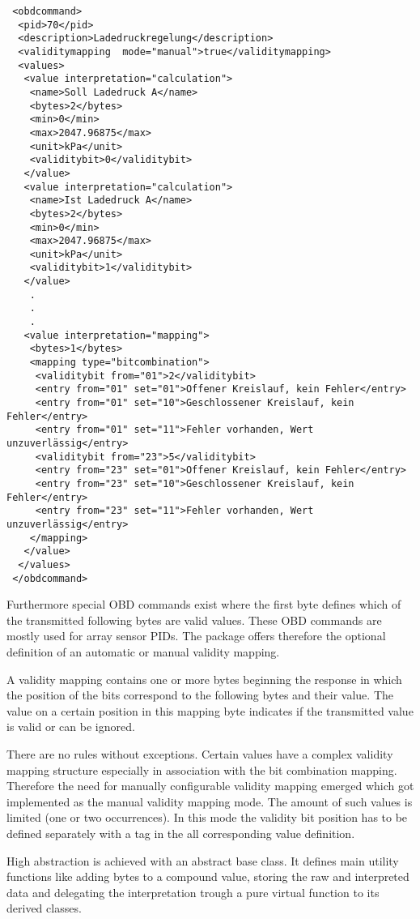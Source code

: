 \begin{lstlisting}
 <obdcommand>
  <pid>70</pid>
  <description>Ladedruckregelung</description>
  <validitymapping  mode="manual">true</validitymapping>
  <values>
   <value interpretation="calculation">
    <name>Soll Ladedruck A</name>
    <bytes>2</bytes>
    <min>0</min>
    <max>2047.96875</max>
    <unit>kPa</unit>
    <validitybit>0</validitybit>    
   </value>
   <value interpretation="calculation">
    <name>Ist Ladedruck A</name>
    <bytes>2</bytes>
    <min>0</min>
    <max>2047.96875</max>
    <unit>kPa</unit>    
    <validitybit>1</validitybit>            
   </value>
    .
    .
    .
   <value interpretation="mapping">
    <bytes>1</bytes>
    <mapping type="bitcombination">
     <validitybit from="01">2</validitybit>
     <entry from="01" set="01">Offener Kreislauf, kein Fehler</entry>
     <entry from="01" set="10">Geschlossener Kreislauf, kein Fehler</entry>
     <entry from="01" set="11">Fehler vorhanden, Wert unzuverlässig</entry>
     <validitybit from="23">5</validitybit>
     <entry from="23" set="01">Offener Kreislauf, kein Fehler</entry>
     <entry from="23" set="10">Geschlossener Kreislauf, kein Fehler</entry>
     <entry from="23" set="11">Fehler vorhanden, Wert unzuverlässig</entry>
    </mapping>        
   </value>
  </values>
 </obdcommand>
\end{lstlisting}

Furthermore special OBD commands exist where the first byte defines which of the transmitted following bytes are valid values. These OBD 
commands are mostly used for array sensor PIDs. The package offers therefore the optional definition of an automatic or manual validity mapping.

A validity mapping contains one or more bytes beginning the response in which the position of the bits correspond to the following bytes and 
their value. The value on a certain position in this mapping byte indicates if the transmitted value is valid or can be ignored.

There are no rules without exceptions. Certain values have a complex validity mapping structure especially in association with the bit 
combination mapping. Therefore the need for manually configurable validity mapping emerged which got implemented as the manual validity mapping 
mode. The amount of such values is limited (one or two occurrences). In this mode the validity bit position has to be defined separately with a 
tag in the all corresponding value definition. 

High abstraction is achieved with an abstract base class. It defines main utility functions like adding bytes to a compound value, storing the 
raw and interpreted data and delegating the interpretation trough a pure virtual function to its derived classes. 

